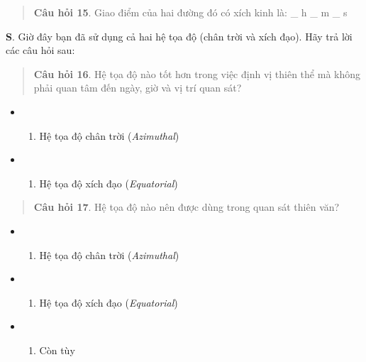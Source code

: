 \documentclass[
]{book}
\providecommand{\tightlist}{%
  \setlength{\itemsep}{0pt}\setlength{\parskip}{0pt}}
\begin{document}
\begin{quote}
\textbf{Câu hỏi 15}. Giao điểm của hai đường đó có xích kinh là:
\_ h
\_ m
\_ s
\end{quote}

\textbf{S}. Giờ đây bạn đã sử dụng cả hai hệ tọa độ (chân trời và xích đạo). Hãy trả lời các câu hỏi sau:

\begin{quote}
\textbf{Câu hỏi 16}. Hệ tọa độ nào tốt hơn trong việc định vị thiên thể mà không phải quan tâm đến ngày, giờ và vị trí quan sát?
\end{quote}

\begin{itemize}
\tightlist
\item
  \begin{enumerate}
  \def\labelenumi{(\Alph{enumi})}
  \tightlist
  \item
    Hệ tọa độ chân trời (\emph{Azimuthal})\\
  \end{enumerate}
\item
  \begin{enumerate}
  \def\labelenumi{(\Alph{enumi})}
  \setcounter{enumi}{1}
  \tightlist
  \item
    Hệ tọa độ xích đạo (\emph{Equatorial})
  \end{enumerate}
\end{itemize}

\begin{quote}
\textbf{Câu hỏi 17}. Hệ tọa độ nào nên được dùng trong quan sát thiên văn?
\end{quote}

\begin{itemize}
\tightlist
\item
  \begin{enumerate}
  \def\labelenumi{(\Alph{enumi})}
  \tightlist
  \item
    Hệ tọa độ chân trời (\emph{Azimuthal})\\
  \end{enumerate}
\item
  \begin{enumerate}
  \def\labelenumi{(\Alph{enumi})}
  \setcounter{enumi}{1}
  \tightlist
  \item
    Hệ tọa độ xích đạo (\emph{Equatorial})\\
  \end{enumerate}
\item
  \begin{enumerate}
  \def\labelenumi{(\Alph{enumi})}
  \setcounter{enumi}{2}
  \tightlist
  \item
    Còn tùy
  \end{enumerate}
\end{itemize}

  
\end{document}
